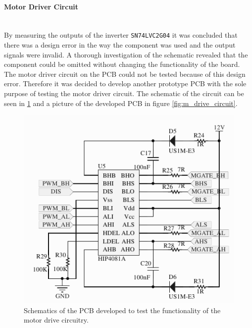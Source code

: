\paragraph{Motor Driver Circuit}~\\
By measuring the outputs of the inverter \texttt{SN74LVC2G04} it was concluded that there was a design error in the way the component was used and the output signals were invalid.
A thorough investigation of the schematic revealed that the component could be omitted without changing the functionality of the board.
The motor driver circuit on the PCB could not be tested because of this design error.
Therefore it was decided to develop another prototype PCB with the sole purpose of testing the motor driver circuit.
The schematic of the circuit can be seen in \ref{fig:m_drive_circuit_schem} and a picture of the developed PCB in figure \ref{fig:m_drive_circuit}.
\begin{figure}
	\centering
	\includegraphics[width=0.6\linewidth]{graphics/hip_testboard_prototype}
	\caption[Prototype PCB with motor driver schematics]{Schematics of the PCB developed to test the functionality of the motor drive circuitry.}
	\label{fig:m_drive_circuit_schem}
\end{figure}

